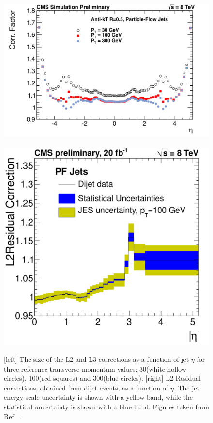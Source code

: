 \begin{figure}[p]
  \centering
\includegraphics[height=0.22\textheight]
{figures/eventreco_objects/CorrectionVsEta_Overview_TDR_ak5pfl1_L2L3}
~
\includegraphics[height=0.22\textheight]
  {figures/eventreco_objects/ResComp_FSRcorr_residuals_Abseta_PF_DiJetData}
  \caption{[left] The size of the L2 and L3 corrections as a function of jet $\eta$ for three
reference transverse momentum values: 30\GeV (white hollow circles), 100\GeV (red squares) and
300\GeV (blue circles). 
[right] L2 Residual corrections, obtained from dijet events, as a function of $\eta$. The jet
energy scale uncertainty is shown with a yellow band, while the statistical uncertainty is shown
with a blue band.
Figures taken from Ref.~\cite{JEC_plots2}.
  \label{fig:JEC_L23}}
\end{figure}

